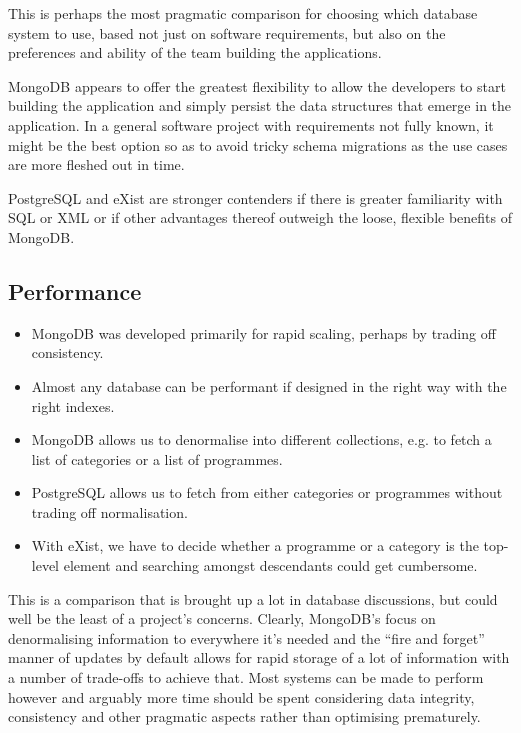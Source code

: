 \documentclass[11pt,a4paper]{article}
\begin{document}
This is perhaps the most pragmatic comparison for choosing which
database system to use, based not just on software requirements, but
also on the preferences and ability of the team building the applications.

MongoDB appears to offer the greatest flexibility to allow the developers
to start building the application and simply persist
the data structures that emerge in the application. In
a general software project with requirements not fully known, it might
be the best option so as to avoid tricky schema migrations as
the use cases are more fleshed out in time.

PostgreSQL and eXist are stronger contenders if there is greater
familiarity with SQL or XML or if other advantages thereof outweigh
the loose, flexible benefits of MongoDB.

\subsection{Performance}

\begin{itemize}
  \item MongoDB was developed primarily for rapid scaling, perhaps by
    trading off consistency.
  \item Almost any database can be performant if designed in the right
    way with the right indexes.
  \item MongoDB allows us to denormalise into different collections, e.g.
    to fetch a list of categories or a list of programmes.
  \item PostgreSQL allows us to fetch from either categories or programmes
    without trading off normalisation.
  \item With eXist, we have to decide whether a programme or a category
    is the top-level element and searching amongst descendants could get
    cumbersome.
\end{itemize}

This is a comparison that is brought up a lot in database discussions, but
could well be the least of a project's concerns. Clearly, MongoDB's focus
on denormalising information to everywhere it's needed and the
``fire and forget'' manner of updates by default allows for rapid storage
of a lot of information with a number of trade-offs to achieve that. Most
systems can be made to perform however and arguably more time should
be spent considering data integrity, consistency and other pragmatic aspects
rather than optimising prematurely.
\end{document}
